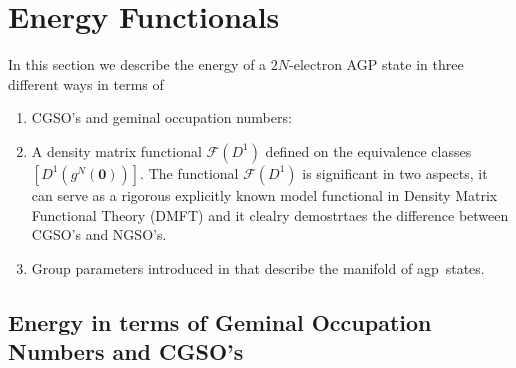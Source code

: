 \documentclass[aps,preprint]{revtex4}%
\begin{document}
\section{Energy Functionals \label{Energy}}

In this section we describe the energy of a $2N$-electron AGP state in three
different ways in terms of

\begin{description}
\item
\begin{enumerate}
\item CGSO's and geminal occupation numbers: 

\item A density matrix functional $\mathcal{F}\left(  D^{1}\right)  $ defined
on the equivalence classes $\left[  D^{1}\left(  g^{N}\left(  \mathbf{0}%
\right)  \right)  \right]  .$ The functional $\mathcal{F}\left(  D^{1}\right)
$ is significant in two aspects, it can serve as a rigorous explicitly known
model functional in Density Matrix Functional Theory (DMFT) \cite{DMFT} and it
clealry demostrtaes the difference between CGSO's and NGSO's.

\item Group parameters introduced in \cite{weiner2004} that describe the
manifold of agp\ states.
\end{enumerate}
\end{description}

\subsection{Energy in terms of Geminal Occupation Numbers and CGSO's}
\end{document}
